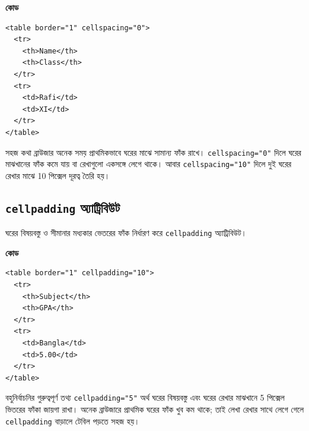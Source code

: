 \par\noindent
\begin{minipage}[t]{.54\linewidth}\vspace{0pt}\small
\textbf{\color{chFourTeal}কোড}\par
\begin{verbatim}
<table border="1" cellspacing="0">
  <tr>
    <th>Name</th>
    <th>Class</th>
  </tr>
  <tr>
    <td>Rafi</td>
    <td>XI</td>
  </tr>
</table>
\end{verbatim}
\par\smallskip
\end{minipage}\hfill
\begin{minipage}[t]{.42\linewidth}\vspace{0pt}\small
\begin{keypointbox}{সহজ কথা}
ব্রাউজার অনেক সময় প্রাথমিকভাবে ঘরের মাঝে সামান্য ফাঁক রাখে। \texttt{cellspacing="0"} দিলে ঘরের মাঝখানের ফাঁক কমে যায় বা রেখাগুলো একসঙ্গে লেগে থাকে। আবার \texttt{cellspacing="10"} দিলে দুই ঘরের রেখার মাঝে 10 পিক্সেল দূরত্ব তৈরি হয়।
\end{keypointbox}
\end{minipage}\par


\subsection{\texttt{cellpadding} অ্যাট্রিবিউট}

\begin{definitionbox}{}
ঘরের বিষয়বস্তু ও সীমানার মধ্যকার ভেতরের ফাঁক নির্ধারণ করে \texttt{cellpadding} অ্যাট্রিবিউট।
\end{definitionbox}

\par\noindent
\begin{minipage}[t]{.54\linewidth}\vspace{0pt}\small
\textbf{\color{chFourTeal}কোড}\par
\begin{verbatim}
<table border="1" cellpadding="10">
  <tr>
    <th>Subject</th>
    <th>GPA</th>
  </tr>
  <tr>
    <td>Bangla</td>
    <td>5.00</td>
  </tr>
</table>
\end{verbatim}
\par\smallskip
\end{minipage}\hfill
\begin{minipage}[t]{.42\linewidth}\vspace{0pt}\small
\begin{boardbox}{বহুনির্বাচনির গুরুত্বপূর্ণ তথ্য}
\texttt{cellpadding="5"} অর্থ ঘরের বিষয়বস্তু এবং ঘরের রেখার মাঝখানে 5 পিক্সেল ভিতরের ফাঁকা জায়গা রাখা। অনেক ব্রাউজারে প্রাথমিক ঘরের ফাঁক খুব কম থাকে; তাই লেখা রেখার সাথে লেগে গেলে \texttt{cellpadding} বাড়ালে টেবিল পড়তে সহজ হয়।
\end{boardbox}
\end{minipage}\par



